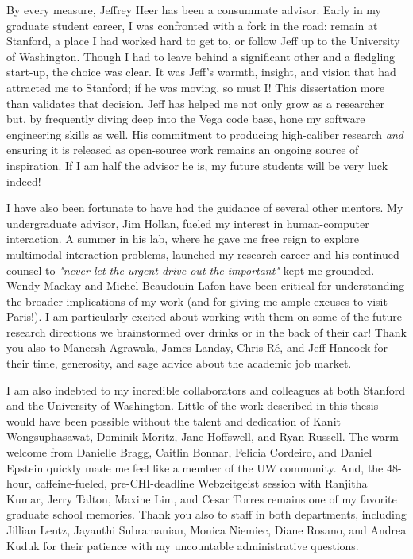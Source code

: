 \label{sec:acknowledgements}

By every measure, Jeffrey Heer has been a consummate advisor. Early in my
graduate student career, I was confronted with a fork in the road: remain at
Stanford, a place I had worked hard to get to, or follow Jeff up to the
University of Washington. Though I had to leave behind a significant other and a
fledgling start-up, the choice was clear. It was Jeff's warmth, insight, and
vision that had attracted me to Stanford; if he was moving, so must I! This
dissertation more than validates that decision. Jeff has helped me not only grow
as a researcher but, by frequently diving deep into the Vega code base, hone my
software engineering skills as well. His commitment to producing high-caliber
research \emph{and} ensuring it is released as open-source work remains an
ongoing source of inspiration. If I am half the advisor he is, my future
students will be very luck indeed!

I have also been fortunate to have had the guidance of several other mentors. My
undergraduate advisor, Jim Hollan, fueled my interest in human-computer
interaction. A summer in his lab, where he gave me free reign to explore
multimodal interaction problems, launched my research career and his continued
counsel to \emph{"never let the urgent drive out the important"} kept me
grounded. Wendy Mackay and Michel Beaudouin-Lafon have been critical for
understanding the broader implications of my work (and for giving me ample
excuses to visit Paris!). I am particularly excited about working with them on
some of the future research directions we brainstormed over drinks or in the
back of their car! Thank you also to Maneesh Agrawala, James Landay, Chris
R\'{e}, and Jeff Hancock for their time, generosity, and sage advice about the
academic job market.

I am also indebted to my incredible collaborators and colleagues at both
Stanford and the University of Washington. Little of the work described in this
thesis would have been possible without the talent and dedication of Kanit
Wongsuphasawat, Dominik Moritz, Jane Hoffswell, and Ryan Russell. The warm
welcome from Danielle Bragg, Caitlin Bonnar, Felicia Cordeiro, and Daniel
Epstein quickly made me feel like a member of the UW community. And, the
48-hour, caffeine-fueled, pre-CHI-deadline Webzeitgeist session with Ranjitha
Kumar, Jerry Talton, Maxine Lim, and Cesar Torres remains one of my favorite
graduate school memories. Thank you also to staff in both departments, including
Jillian Lentz, Jayanthi Subramanian, Monica Niemiec, Diane Rosano, and Andrea
Kuduk for their patience with my uncountable administrative questions.

